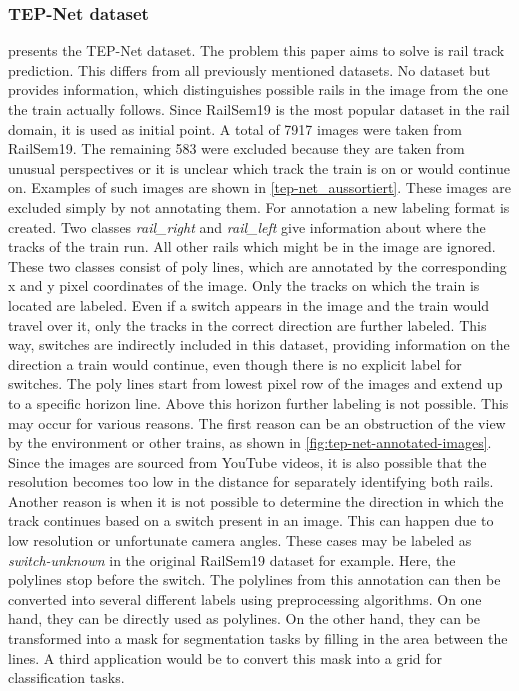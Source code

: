 \subsubsection{TEP-Net dataset}
\cite{tepNet2024} presents the \ac{TEP}-Net dataset. The problem this paper aims to solve is rail track prediction. This differs from all previously mentioned datasets. No dataset but \cite{tepNet2024} provides information, which distinguishes possible rails in the image from the one the train actually follows. Since RailSem19 is the most popular dataset in the rail domain, it is used as initial point. A total of 7917 images were taken from RailSem19. The remaining 583 were excluded because they are taken from unusual perspectives or it is unclear which track the train is on or would continue on. Examples of such images are shown in \ref{tep-net_aussortiert}. These images are excluded simply by not annotating them. For annotation a new labeling format is created. Two classes \textit{rail\_right} and \textit{rail\_left} give information about where the tracks of the train  run. All other rails which might be in the image are ignored. These two classes consist of poly lines, which are annotated by the corresponding x and y pixel coordinates of the image. Only the tracks on which the train is located are labeled. Even if a switch appears in the image and the train would travel over it, only the tracks in the correct direction are further labeled. This way, switches are indirectly included in this dataset, providing information on the direction a train would continue, even though there is no explicit label for switches.
The poly lines start from lowest pixel row of the images and extend up to a specific horizon line. Above this horizon further labeling is not possible. This may occur for various reasons. The first reason can be an obstruction of the view by the environment or other trains, as shown in \ref{fig:tep-net-annotated-images}. Since the images are sourced from YouTube videos, it is also possible that the resolution becomes too low in the distance for separately identifying both rails. Another reason is when it is not possible to determine the direction in which the track continues based on a switch present in an image. This can happen due to low resolution or unfortunate camera angles. These cases may be labeled as \textit{switch-unknown} in the original RailSem19 dataset for example. Here, the polylines stop before the switch.
The polylines from this annotation can then be converted into several different labels using preprocessing algorithms. On one hand, they can be directly used as polylines. On the other hand, they can be transformed into a mask for segmentation tasks by filling in the area between the lines. A third application would be to convert this mask into a grid for classification tasks.

